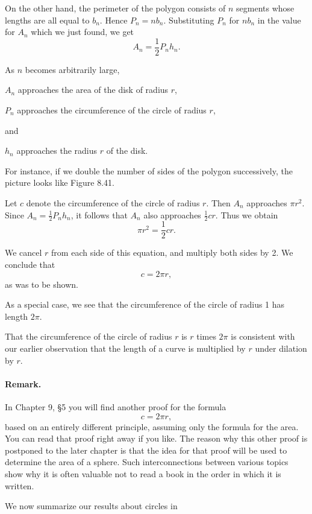 \documentclass[12pt]{book} %
\begin{document}
On the other hand, the perimeter of the polygon consists of $n$ segments whose lengths are all equal to $b_n$. Hence $P_n=nb_n$. Substituting $P_n$ for $nb_n$ in the value for $A_n$ which we just found, we get
\[
A_n=\frac12 P_n h_n.
\]

As $n$ becomes arbitrarily large,
\begin{center}
$A_n$ approaches the area of the disk of radius $r$,

$P_n$ approaches the circumference of the circle of radius $r$,

and

$h_n$ approaches the radius $r$ of the disk.
\end{center}

For instance, if we double the number of sides of the polygon successively, the picture looks like Figure 8.41.


Let $c$ denote the circumference of the circle of radius $r$. Then $A_n$ approaches $\pi r^2$. Since $A_n=\frac12 P_n h_n$, it follows that $A_n$ also approaches $\frac12 cr$. Thus we obtain
\[
\pi r^2=\frac12 cr.
\]

We cancel $r$ from each side of this equation, and multiply both sides by 2. We conclude that
\[
c=2\pi r,
\]
as was to be shown.

As a special case, we see that the circumference of the circle of radius 1 has length $2\pi$.

That the circumference of the circle of radius $r$ is $r$ times $2\pi$ is consistent with our earlier observation that the length of a curve is multiplied by $r$ under dilation by $r$.

\paragraph{Remark.}
In Chapter 9, \S5 you will find another proof for the formula
\[
c=2\pi r,
\]
based on an entirely different principle, assuming only the formula for the area. You can read that proof right away if you like. The reason why this other proof is postponed to the later chapter is that the idea for that proof will be used to determine the area of a sphere. Such interconnections between various topics show why it is often valuable not to read a book in the order in which it is written.

We now summarize our results about circles in

\end{document}
